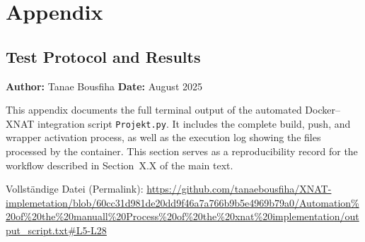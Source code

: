 
    


\appendix
\chapter{Appendix}
\section{Test Protocol and Results}

\label{app:test}

\noindent\textbf{Author:} Tanae Bousfiha  
\noindent\textbf{Date:} August 2025  

\noindent This appendix documents the full terminal output of the automated Docker–XNAT integration script
\texttt{Projekt.py}.  
It includes the complete build, push, and wrapper activation process, as well as the execution log showing the files processed by the container.  
This section serves as a reproducibility record for the workflow described in Section~X.X of the main text.




\lstset{inputpath=en/content}



\noindent Vollständige Datei (Permalink):  
\url{https://github.com/tanaebousfiha/XNAT-implemetation/blob/60cc31d981de20dd9f46a7a766b9b5e4969b79a0/Automation%20of%20the%20manuall%20Process%20of%20the%20xnat%20implementation/output_script.txt#L5-L28}















